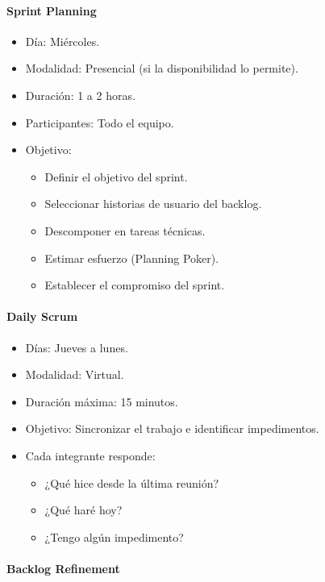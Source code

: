 \documentclass[12pt]{article}
\begin{document}
\paragraph{Sprint Planning}

\begin{itemize}
    \item Día: Miércoles.
    \item Modalidad: Presencial (si la disponibilidad lo permite).
    \item Duración: 1 a 2 horas.
    \item Participantes: Todo el equipo.
    \item Objetivo:
    \begin{itemize}
        \item Definir el objetivo del sprint.
        \item Seleccionar historias de usuario del backlog.
        \item Descomponer en tareas técnicas.
        \item Estimar esfuerzo (Planning Poker).
        \item Establecer el compromiso del sprint.
    \end{itemize}
\end{itemize}

\paragraph{Daily Scrum}

\begin{itemize}
    \item Días: Jueves a lunes.
    \item Modalidad: Virtual.
    \item Duración máxima: 15 minutos.
    \item Objetivo: Sincronizar el trabajo e identificar impedimentos.
    \item Cada integrante responde:
    \begin{itemize}
        \item ¿Qué hice desde la última reunión?
        \item ¿Qué haré hoy?
        \item ¿Tengo algún impedimento?
    \end{itemize}
\end{itemize}

\paragraph{Backlog Refinement}
\end{document}

